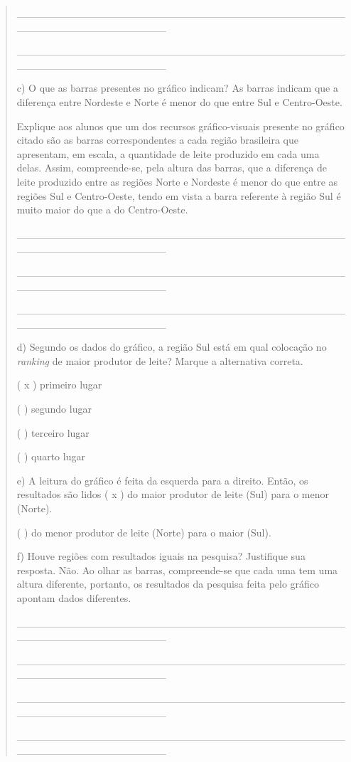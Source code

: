 \begin{quote}
\_\_\_\_\_\_\_\_\_\_\_\_\_\_\_\_\_\_\_\_\_\_\_\_\_\_\_\_\_\_\_\_\_\_\_\_\_\_\_\_\_\_\_\_\_\_\_\_\_\_\_\_\_\_\_\_\_\_\_\_\_\_\_\_

\_\_\_\_\_\_\_\_\_\_\_\_\_\_\_\_\_\_\_\_\_\_\_\_\_\_\_\_\_\_\_\_\_\_\_\_\_\_\_\_\_\_\_\_\_\_\_\_\_\_\_\_\_\_\_\_\_\_\_\_\_\_\_\_

c) O que as barras presentes no gráfico indicam? As barras indicam que a
diferença entre Nordeste e Norte é menor do que entre Sul e
Centro-Oeste.

Explique aos alunos que um dos recursos gráfico-visuais presente no
gráfico citado são as barras correspondentes a cada região brasileira
que apresentam, em escala, a quantidade de leite produzido em cada uma
delas. Assim, compreende-se, pela altura das barras, que a diferença de
leite produzido entre as regiões Norte e Nordeste é menor do que entre
as regiões Sul e Centro-Oeste, tendo em vista a barra referente à região
Sul é muito maior do que a do Centro-Oeste.

\_\_\_\_\_\_\_\_\_\_\_\_\_\_\_\_\_\_\_\_\_\_\_\_\_\_\_\_\_\_\_\_\_\_\_\_\_\_\_\_\_\_\_\_\_\_\_\_\_\_\_\_\_\_\_\_\_\_\_\_\_\_\_\_

\_\_\_\_\_\_\_\_\_\_\_\_\_\_\_\_\_\_\_\_\_\_\_\_\_\_\_\_\_\_\_\_\_\_\_\_\_\_\_\_\_\_\_\_\_\_\_\_\_\_\_\_\_\_\_\_\_\_\_\_\_\_\_\_

\_\_\_\_\_\_\_\_\_\_\_\_\_\_\_\_\_\_\_\_\_\_\_\_\_\_\_\_\_\_\_\_\_\_\_\_\_\_\_\_\_\_\_\_\_\_\_\_\_\_\_\_\_\_\_\_\_\_\_\_\_\_\_\_

d) Segundo os dados do gráfico, a região Sul está em qual colocação no
\emph{ranking} de maior produtor de leite? Marque a alternativa correta.

( x ) primeiro lugar

( ) segundo lugar

( ) terceiro lugar

( ) quarto lugar

e) A leitura do gráfico é feita da esquerda para a direito. Então, os
resultados são lidos ( x ) do maior produtor de leite (Sul) para o menor
(Norte).

( ) do menor produtor de leite (Norte) para o maior (Sul).

f) Houve regiões com resultados iguais na pesquisa? Justifique sua
resposta. Não. Ao olhar as barras, compreende-se que cada uma tem uma
altura diferente, portanto, os resultados da pesquisa feita pelo gráfico
apontam dados diferentes.

\_\_\_\_\_\_\_\_\_\_\_\_\_\_\_\_\_\_\_\_\_\_\_\_\_\_\_\_\_\_\_\_\_\_\_\_\_\_\_\_\_\_\_\_\_\_\_\_\_\_\_\_\_\_\_\_\_\_\_\_\_\_\_\_

\_\_\_\_\_\_\_\_\_\_\_\_\_\_\_\_\_\_\_\_\_\_\_\_\_\_\_\_\_\_\_\_\_\_\_\_\_\_\_\_\_\_\_\_\_\_\_\_\_\_\_\_\_\_\_\_\_\_\_\_\_\_\_\_

\_\_\_\_\_\_\_\_\_\_\_\_\_\_\_\_\_\_\_\_\_\_\_\_\_\_\_\_\_\_\_\_\_\_\_\_\_\_\_\_\_\_\_\_\_\_\_\_\_\_\_\_\_\_\_\_\_\_\_\_\_\_\_\_

\_\_\_\_\_\_\_\_\_\_\_\_\_\_\_\_\_\_\_\_\_\_\_\_\_\_\_\_\_\_\_\_\_\_\_\_\_\_\_\_\_\_\_\_\_\_\_\_\_\_\_\_\_\_\_\_\_\_\_\_\_\_\_\_
\end{quote}


